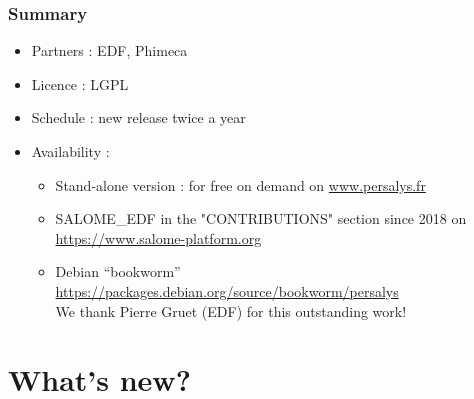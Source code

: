 \documentclass[aspectratio=169]{beamer}
\begin{document}

\begin{frame}
  \frametitle{Summary}
  \begin{itemize}
  \item Partners : EDF, Phimeca
  \item Licence : LGPL
  \item Schedule : new release twice a year
  \item Availability :
    \begin{itemize}
    \item Stand-alone version : for free on demand on \url{www.persalys.fr}
    \item SALOME\_EDF in the "CONTRIBUTIONS" section
      since 2018 on \url{https://www.salome-platform.org}
    \item Debian ``bookworm'' \url{https://packages.debian.org/source/bookworm/persalys} \\
      We thank Pierre Gruet (EDF) for this outstanding work!
    \end{itemize}
  \end{itemize}
\end{frame}

\section{What's new?}
\end{document}
